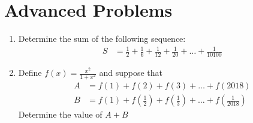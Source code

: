 \documentclass[12pt]{article}
\begin{document}
\newpage
\section*{Advanced Problems}
\begin{enumerate}
    \item Determine the sum of the following sequence:
    \begin{align*}
        S & = \frac{1}{2} + \frac{1}{6} + \frac{1}{12} + \frac{1}{20} + \dots + \frac{1}{10100}
    \end{align*} \newpage
    \item Define $f(x)=\frac{x^2}{1+x^2}$ and suppose that \begin{align*}
        A & = f(1) + f(2) + f(3) + \dots + f(2018) \\
        B & = f(1) + f(\frac{1}{2}) + f(\frac{1}{3}) + \dots + f(\frac{1}{2018})
    \end{align*}
    Determine the value of $A + B$
\end{enumerate}
\end{document}
